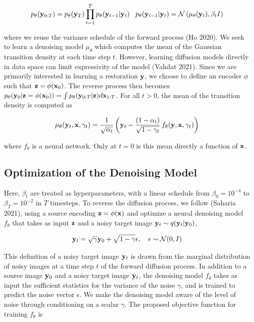 \documentclass{article}
\begin{document}
\begin{equation}
p_{\theta}(\bold{y}_{0:T}) = p_{\theta}(\bold{y}_{T})\prod_{t=1}^{T} p_{\theta}(\bold{y}_{t-1}|\bold{y}_{t}) \;\;\; p_{\theta}(\bold{y}_{t-1}|\bold{y}_{t}) = \mathcal{N}\left(\mu_{\theta}(\bold{y}_{t}),\beta_{t}I\right)
\end{equation}

where we reuse the variance schedule of the forward process (Ho 2020). We seek to learn a denoising model $\mu_{\theta}$ which computes the mean of the Gaussian transition density at each time step $t$. However, learning diffusion models directly in data space can limit expressivity of the model (Vahdat 2021). Since we are primarily interested in learning a restoration $\bold{y}$, we choose to define an encoder $\phi$ such that $\bold{z} = \phi(\bold{x}_{0})$. The reverse process then becomes $p_{\theta}(\bold{y}_{0}|\bold{z}=\phi(\bold{x}_{0})) = \int p_{\theta}(\bold{y}_{0:T}|\bold{z})d\bold{x}_{1:T}$. For all $t > 0$, the mean of the transition density is computed as

\begin{equation}
\mu_{\theta}(\bold{y}_t, \bold{x}, \gamma_t) = \frac{1}{\sqrt{\alpha_t}} \left(\bold{y}_t - \frac{(1 - \alpha_t)}{\sqrt{1 - \gamma_t}} \, f_{\theta}(\bold{y}, \bold{x}, \gamma_t) \right)
\end{equation}

where $f_{\theta}$ is a neural network. Only at $t=0$ is this mean directly a function of $\bold{x}$. 

\subsection{Optimization of the Denoising Model}

Here, $\beta_{t}$ are treated as hyperparameters, with a linear schedule from $\beta_{0}=10^{-4}$ to $\beta_{T}=10^{-2}$ in $T$ timesteps. To reverse the diffusion process, we follow (Saharia 2021), using a source encoding $\bold{z} = \phi(\bold{x})$ and optimize a neural denoising model $f_{\theta}$ that takes as input $\bold{z}$ and a noisy target image $\bold{y}_t \sim q(\bold{y}_t|\bold{y}_0)$,

\begin{equation}
\bold{y}_t = \sqrt{\gamma} \bold{y}_0 + \sqrt{1 - \gamma} \epsilon, \quad \epsilon \sim \mathcal{N}(0, I)
\end{equation}

This definition of a noisy target image $\bold{y}_t$ is drawn from the marginal distribution of noisy images at a time step $t$ of the forward diffusion process. In addition to a source image $\bold{y}_{0}$ and a noisy target image $\bold{y}_t$, the denoising model $f_{\theta}$ takes as input the sufficient statistics for the variance of the noise $\gamma$, and is trained to predict the noise vector $\epsilon$. We make the denoising model aware of the level of noise through conditioning on a scalar $\gamma$. The proposed objective function for training $f_{\theta}$ is
\end{document}
